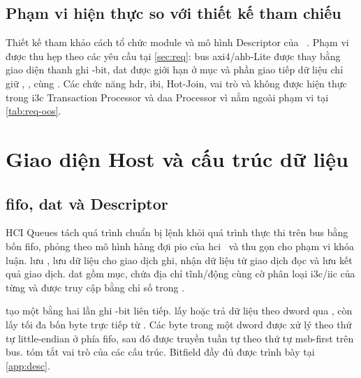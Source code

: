 \subsection{Phạm vi hiện thực so với thiết kế tham chiếu}
\label{sec:arch-reference}

Thiết kế tham khảo cách tổ chức module và mô hình Descriptor của \CHIPSAlliance{} \IThreeCCore{}~\cite{chipsalliance_i3c}. Phạm vi được thu hẹp theo các yêu cầu tại \cref{sec:req}: bus \acrshort{axi}4/\acrshort{ahb}-Lite được thay bằng giao diện thanh ghi \RegisterDataWidth{}-bit, \gls{dat} được giới hạn ở \DatEntryCount{} mục và phần giao tiếp dữ liệu chỉ giữ \CommandFifo{}, \TxFifo{}, \RxFifo{} cùng \ResponseFifo{}. Các chức năng \gls{hdr}, \gls{ibi}, Hot-Join, vai trò \Target{} và \SecondaryController{} không được hiện thực trong \gls{i3c} Transaction Processor và \acrshort{daa} Processor vì nằm ngoài phạm vi tại \cref{tab:req-oos}.

\section{Giao diện Host và cấu trúc dữ liệu}
\label{sec:arch-data}

\subsection{\texorpdfstring{\gls{fifo}, \gls{dat}}{FIFO, DAT} và Descriptor}
\label{sec:arch-desc}

HCI Queues tách quá trình chuẩn bị lệnh khỏi quá trình thực thi trên bus bằng bốn \gls{fifo}, phỏng theo mô hình hàng đợi \gls{pio} của \gls{hci}~\cite{mipi_i3c_hci} và thu gọn cho phạm vi khóa luận. \CommandFifo{} lưu \CommandDescriptor{}, \TxFifo{} lưu dữ liệu cho giao dịch ghi, \RxFifo{} nhận dữ liệu từ giao dịch đọc và \ResponseFifo{} lưu kết quả giao dịch. \gls{dat} gồm \DatEntryCount{} mục, chứa địa chỉ tĩnh/động cùng cờ phân loại \gls{i3c}/\gls{iic} của từng \Target{} và được truy cập bằng chỉ số \Target{} trong \CommandDescriptor{}.

\Host{} tạo một \CommandDescriptor{} bằng hai lần ghi \RegisterDataWidth{}-bit liên tiếp. \RegularTransfer{} lấy hoặc trả dữ liệu theo \gls{dword} qua \TxRxFifo{}, còn \ImmediateDataTransfer{} lấy tối đa bốn byte trực tiếp từ \CommandDescriptor{}. Các byte trong một \gls{dword} được xử lý theo thứ tự little-endian ở phía \gls{fifo}, sau đó được truyền tuần tự theo thứ tự \gls{msb}-first trên bus.  tóm tắt vai trò của các cấu trúc. Bitfield đầy đủ được trình bày tại \cref{app:desc}.

